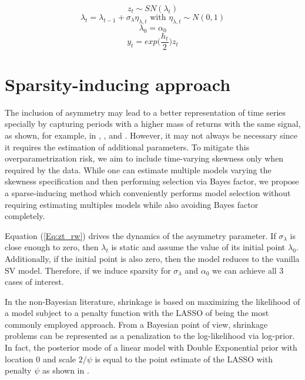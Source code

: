 \documentclass{article}
\begin{document}
\begin{equation}\label{Eq:zt_dyn}
   z_t \sim SN(\lambda_t) 
\end{equation}
\begin{equation}\label{Eq:zt_rw}
   \lambda_t = \lambda_{t-1}  + \sigma_{\lambda} \eta_{\lambda,t} \text{ with } \eta_{\lambda,t} \sim N(0,1)
\end{equation}
\begin{equation}\label{Eq:zt_init}
   \lambda_0 = \alpha_0
\end{equation}
\begin{equation}\label{SVSkew_obs_eq}
    y_t = exp\Bigg(\frac{h_t}{2} \Bigg) z_t  
\end{equation}

\section{Sparsity-inducing approach}\label{Sec:Sparsity}

The inclusion of asymmetry may lead to a better representation of time series specially by capturing periods with a higher mass of returns with the same signal, as shown, for example, in \cite{bianchi2022taming}, \cite{azzalini2013skew}, and \cite{rachev2005fat}. However, it may not always be necessary since it requires the estimation of additional parameters. To mitigate this overparametrization risk, we aim to include time-varying skewness only when required by the data. While one can estimate multiple models varying the skewness specification and then performing selection via Bayes factor, we propose a sparse-inducing method which conveniently performs model selection without requiring estimating multiples models while also avoiding Bayes factor completely. 

Equation (\ref{Eq:zt_rw}) drives the dynamics of the asymmetry parameter. If $\sigma_{\lambda}$ is close enough to zero, then $\lambda_t$ is static and assume the value of its initial point $\lambda_0$. Additionally, if the initial point is also zero, then the model reduces to the vanilla SV model. Therefore, if we induce sparsity for $\sigma_{\lambda}$ and $\alpha_0$ we can achieve all 3 cases of interest.

In the non-Bayesian literature, shrinkage is based on maximizing the likelihood of a model subject to a penalty function with the LASSO of \cite{tibshirani1996regression} being the most commonly employed approach. From a Bayesian point of view, shrinkage problems can be represented as a penalization to the log-likelihood via log-prior. In fact, the posterior mode of a linear model with Double Exponential prior with location 0 and scale $2/\psi$ is equal to the point estimate of the LASSO with penalty $\psi$ as shown in \cite{park2008bayesian}. 
\end{document}
